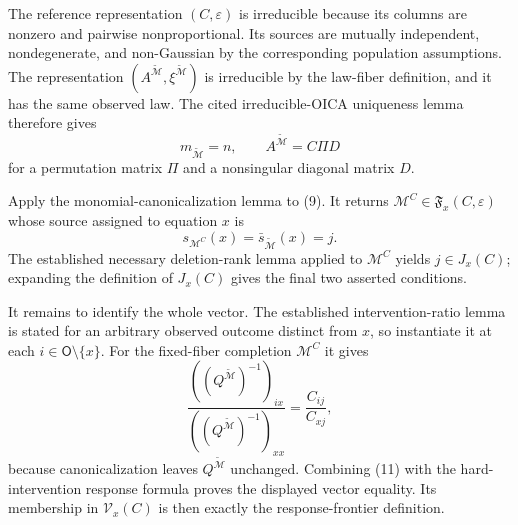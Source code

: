 The reference representation \((C,\varepsilon)\) is irreducible because its columns are nonzero and pairwise nonproportional. Its sources are mutually independent, nondegenerate, and non-Gaussian by the corresponding population assumptions. The representation \((A^{\widetilde{\mathcal M}},\xi^{\widetilde{\mathcal M}})\) is irreducible by the law-fiber definition, and it has the same observed law. The cited irreducible-OICA uniqueness lemma therefore gives
\[
 m_{\widetilde{\mathcal M}}=n,
 \qquad
 A^{\widetilde{\mathcal M}}=C\Pi D \tag{9}
\]
for a permutation matrix \(\Pi\) and a nonsingular diagonal matrix \(D\).

Apply the monomial-canonicalization lemma to (9). It returns \(\mathcal M^C\in\mathfrak F_x(C,\varepsilon)\) whose source assigned to equation \(x\) is
\[
 s_{\mathcal M^C}(x)=\bar s_{\widetilde{\mathcal M}}(x)=j. \tag{10}
\]
The established necessary deletion-rank lemma applied to \(\mathcal M^C\) yields \(j\in J_x(C)\); expanding the definition of \(J_x(C)\) gives the final two asserted conditions.

It remains to identify the whole vector. The established intervention-ratio lemma is stated for an arbitrary observed outcome distinct from \(x\), so instantiate it at each \(i\in\mathsf O\setminus\{x\}\). For the fixed-fiber completion \(\mathcal M^C\) it gives
\[
 \frac{((Q^{\widetilde{\mathcal M}})^{-1})_{ix}}
 {((Q^{\widetilde{\mathcal M}})^{-1})_{xx}}
 =\frac{C_{ij}}{C_{xj}}, \tag{11}
\]
because canonicalization leaves \(Q^{\widetilde{\mathcal M}}\) unchanged. Combining (11) with the hard-intervention response formula proves the displayed vector equality. Its membership in \(\mathcal V_x(C)\) is then exactly the response-frontier definition.
